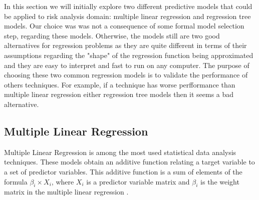 In this section we will initially explore two different predictive models that could be applied to risk analysis domain: multiple linear regression and regression tree models. Our choice was was not a consequence of some formal model selection step, regarding these models. Otherwise, the models still are two good alternatives for regression problems as they are quite different in terms of their assumptions regarding the "shape" of the regression function being approximated and they are easy to interpret and fast to run on any computer.  The purpose of choosing these two common regression models is to validate the performance of others techniques. For example, if a technique has worse perfformance than multiple linear regression either regression tree models then it seems a bad alternative.

\subsection{Multiple Linear Regression}

Multiple Linear Regression is among the most used statistical data analysis techniques. These models obtain an additive function relating a target variable to a set of predictor variables. This additive function is a sum of elements of the formula $\beta_i \times X_i$, where $X_i$ is a predictor variable matrix and $\beta_i$ is the weight matrix in the multiple linear regression \cite{torgo2003data}.

